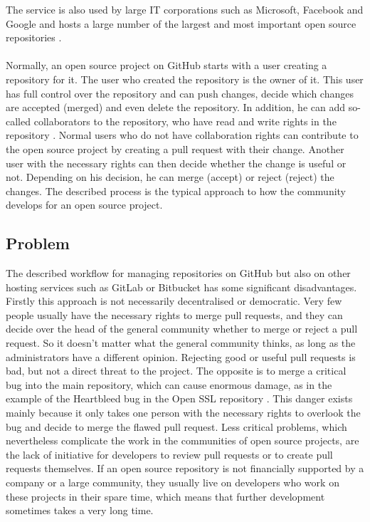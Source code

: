 \documentclass[sigconf]{acmart}
\begin{document}
\cite{git2021hub} The service is also used by large IT corporations such as Microsoft, Facebook and Google and hosts a large 
number of the largest and most important open source repositories \cite{git2021stars}.\\ \\
Normally, an open source project on GitHub starts with a user creating a repository for it. The user who created the 
repository is the owner of it. This user has full control over the repository and can push changes, decide which changes are 
accepted (merged) and even delete the repository. In addition, he can add so-called collaborators to the repository, who have 
read and write rights in the repository \cite{git2021rights}. Normal users who do not have collaboration rights can contribute to 
the open source project by creating a pull request with their change. Another user with the necessary rights can then decide 
whether the change is useful or not. Depending on his decision, he can merge (accept) or reject (reject) the changes. 
The described process is the typical approach to how the community develops for an open source project.


\subsection{Problem}
The described workflow for managing repositories on GitHub but also on other hosting services such as GitLab or Bitbucket has 
some significant disadvantages. Firstly this approach is not necessarily decentralised or democratic. Very few people usually have 
the necessary rights to merge pull requests, and they can decide over the head of the general community whether to merge or reject
 a pull request. So it doesn't matter what the general community thinks, as long as the administrators have a different opinion. Rejecting
 good or useful pull requests is bad, but not a direct threat to the project. The opposite is to merge a critical bug into the main repository,
 which can cause enormous damage, as in the example of the Heartbleed bug in the Open SSL repository \cite{ioriheartbleed}. This 
danger exists mainly because it only takes one person with the necessary rights to overlook the bug and decide to merge the flawed 
pull request. Less critical problems, which nevertheless complicate the work in the communities of open source projects, are the lack
 of initiative for developers to review pull requests or to create pull requests themselves. If an open source repository is not financially
 supported by a company or a large community, they usually live on developers who work on these projects in their spare time, which 
means that further development sometimes takes a very long time. 
\end{document}
